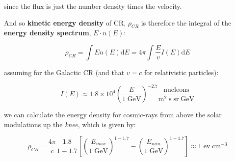 \documentclass[
  letterpaper,
  DIV=11,
  numbers=noendperiod]{scrreprt}
\newenvironment{Shaded}{\begin{snugshade}}{\end{snugshade}}
\newcommand{\BuiltInTok}[1]{\textcolor[rgb]{0.00,0.23,0.31}{#1}}
\newcommand{\CommentTok}[1]{\textcolor[rgb]{0.37,0.37,0.37}{#1}}
\newcommand{\DecValTok}[1]{\textcolor[rgb]{0.68,0.00,0.00}{#1}}
\newcommand{\FloatTok}[1]{\textcolor[rgb]{0.68,0.00,0.00}{#1}}
\newcommand{\ImportTok}[1]{\textcolor[rgb]{0.00,0.46,0.62}{#1}}
\newcommand{\NormalTok}[1]{\textcolor[rgb]{0.00,0.23,0.31}{#1}}
\newcommand{\OperatorTok}[1]{\textcolor[rgb]{0.37,0.37,0.37}{#1}}
\newcommand{\SpecialCharTok}[1]{\textcolor[rgb]{0.37,0.37,0.37}{#1}}
\newcommand{\StringTok}[1]{\textcolor[rgb]{0.13,0.47,0.30}{#1}}
\newcommand{\VerbatimStringTok}[1]{\textcolor[rgb]{0.13,0.47,0.30}{#1}}
\begin{document}
since the flux is just the number density times the velocity.

And so \textbf{kinetic energy density} of CR, \(\rho_{CR}\) is therefore
the integral of the \textbf{energy density spectrum}, \(E\cdot n(E)\):

\[\rho_{CR} = \int E n(E) \mathrm{ d} E =4\pi \int \frac{E}{v}I(E) \mathrm{ d} E\]

assuming for the Galactic CR (and that \(v = c\) for relativistic
particles):

\[ I(E) \approx 1.8 \times 10^4 \left(\frac{E}{1\; \mathrm{GeV}}\right)^{-2.7} \frac{\mathrm{nucleons}}{\mathrm{m}^2\; \mathrm{s\;sr\;GeV}}\]

we can calculate the energy density for cosmic-rays from above the solar
modulations up the \emph{knee}, which is given by:

\[ \rho_{CR} = \frac{4\pi}{c} \frac{1.8}{1 - 1.7} \left[\left(\frac{E_{max}}{1\;\mathrm{GeV}}\right)^{1 -1.7} - \left(\frac{E_{min}}{1\;\mathrm{GeV}}\right)^{1 -1.7}\right] \approx 1\; \mathrm{ev\;cm}^{-3}\]

\begin{Shaded}
\end{Shaded}
\end{document}
